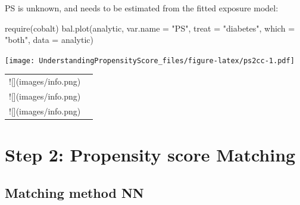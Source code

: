 \documentclass[
]{book}
\newenvironment{Shaded}{\begin{snugshade}}{\end{snugshade}}
\newcommand{\AttributeTok}[1]{\textcolor[rgb]{0.77,0.63,0.00}{#1}}
\newcommand{\CommentTok}[1]{\textcolor[rgb]{0.56,0.35,0.01}{\textit{#1}}}
\newcommand{\FunctionTok}[1]{\textcolor[rgb]{0.00,0.00,0.00}{#1}}
\newcommand{\NormalTok}[1]{#1}
\newcommand{\OtherTok}[1]{\textcolor[rgb]{0.56,0.35,0.01}{#1}}
\newcommand{\SpecialCharTok}[1]{\textcolor[rgb]{0.00,0.00,0.00}{#1}}
\newcommand{\StringTok}[1]{\textcolor[rgb]{0.31,0.60,0.02}{#1}}
\begin{document}
PS is unknown, and needs to be estimated from the fitted exposure model:

\begin{Shaded}
\end{Shaded}

\begin{Shaded}
\begin{Highlighting}[]
\FunctionTok{require}\NormalTok{(cobalt)}
\FunctionTok{bal.plot}\NormalTok{(analytic, }\AttributeTok{var.name =} \StringTok{"PS"}\NormalTok{, }
         \AttributeTok{treat =} \StringTok{"diabetes"}\NormalTok{, }
         \AttributeTok{which =} \StringTok{"both"}\NormalTok{, }
         \AttributeTok{data =}\NormalTok{ analytic)}
\end{Highlighting}
\end{Shaded}

\texttt{[image: UnderstandingPropensityScore\_files/figure-latex/ps2cc-1.pdf]}

\begin{tabular}{l>{}l}
\toprule
![](images/info.png) & \cellcolor[HTML]{3A3B3C}{\textcolor{white}{Don't loose sight that better **balance** is the ultimate goal for propensity score}}\\
![](images/info.png) & \cellcolor[HTML]{3A3B3C}{\textcolor{white}{Prediction of \$A\$ is just a means to that end (as true PS is unknown)}}\\
![](images/info.png) & \cellcolor[HTML]{3A3B3C}{\textcolor{white}{May attract variables highly associated with \$A\$}}\\
\bottomrule
\end{tabular}

\hypertarget{s2}{%
\chapter{Step 2: Propensity score Matching}\label{s2}}

\hypertarget{matching-method-nn}{%
\section{Matching method NN}\label{matching-method-nn}}
\end{document}
